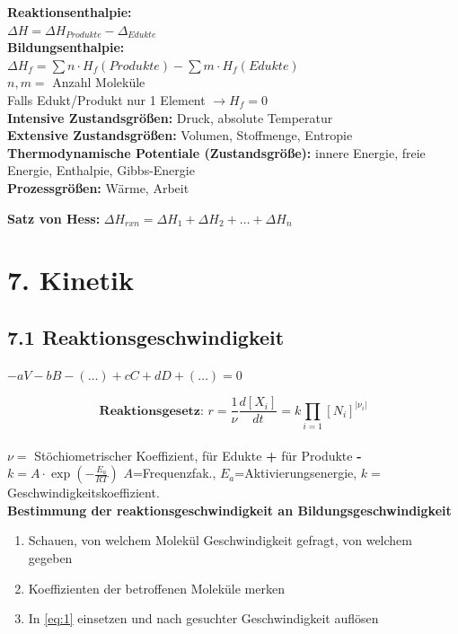 \begin{multicols*}{4}
{\textbf{Reaktionsenthalpie:}\\ 
    $\Delta H = \Delta H_{Produkte} - \Delta_{Edukte}$\vspace{1mm}\\
\textbf{Bildungsenthalpie:} \\
    $\Delta H_f = \sum n\cdot H_f(Produkte) - \sum m\cdot H_f(Edukte)$\\
    $n,m = $ Anzahl Moleküle\\
Falls Edukt/Produkt nur 1 Element $\rightarrow H_f=0$\\

    \textbf{Intensive Zustandsgrößen: }Druck, absolute Temperatur\\
    \textbf{Extensive Zustandsgrößen: }Volumen, Stoffmenge, Entropie\\
    \textbf{Thermodynamische Potentiale (Zustandsgröße): }innere Energie, freie Energie, Enthalpie, Gibbs-Energie\\
    \textbf{Prozessgrößen: }Wärme, Arbeit

\textbf{Satz von Hess:} $\Delta H_{rxn}=\Delta H_1 + \Delta H_2 + \dots + \Delta H_n$
}





\section{7. Kinetik}
\subsection{7.1 Reaktionsgeschwindigkeit}{
    $-aV-bB-(\dots)+cC+dD+(\dots)=0$

    \begin{equation}\label{eq:1}
        \textbf{Reaktionsgesetz: }r=\frac{1}{\nu}\frac{d\left[X_i\right]}{dt}=k\prod_{i=1}{\left[N_i\right]}^{|\nu_i|}
    \end{equation}\\
    $\nu=$ Stöchiometrischer Koeffizient, für Edukte \textbf{+} für Produkte \textbf{-}
    $k=A\cdot\exp\left(-\frac{E_a}{RT}\right)$ $A$=Frequenzfak., $E_a$=Aktivierungsenergie, 
    $k=$ Geschwindigkeitskoeffizient. \\

\textbf{Bestimmung der reaktionsgeschwindigkeit an Bildungsgeschwindigkeit}\\
\begin{enumerate}[noitemsep,leftmargin=*]
    \vspace*{-4.5mm}
    \item Schauen, von welchem Molekül Geschwindigkeit gefragt, von welchem gegeben
    \item Koeffizienten der betroffenen Moleküle merken
    \item In \ref{eq:1} einsetzen und nach gesuchter Geschwindigkeit auflösen
\end{enumerate}
}


\end{multicols*}
